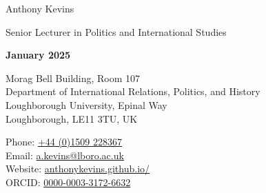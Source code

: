 \documentclass[letterpaper,fontsize=10.5pt]{scrartcl}
\begin{document}


\huge Anthony Kevins\\
\begin{minipage}[t]{.75\linewidth}
	\large Senior Lecturer in Politics and International Studies\\ 
\end{minipage}%
\begin{minipage}[t]{.25\linewidth}
	\raggedleft
	\scriptsize \textbf{January 2025}\\
\end{minipage}%
\normalsize

\hrulefill

\begin{minipage}[p]{.6\linewidth}
	\raggedright
	\medskip
	Morag Bell Building, Room 107\\
	Department of International Relations, Politics, and History\\
	Loughborough University, Epinal Way\\
	Loughborough, LE11 3TU, UK\\
	\medskip
\end{minipage}%
\begin{minipage}[p]{.4\linewidth}
	\raggedleft
	\medskip
	Phone: \href{tel:+4401509228367}{+44 (0)1509 228367}\\
	Email: \href{mailto:a.kevins@lboro.ac.uk}{a.kevins@lboro.ac.uk}\\
	Website: \href{https://anthonykevins.github.io/}{anthonykevins.github.io/}\\
	ORCID: \href{https://orcid.org/0000-0003-3172-6632}{0000-0003-3172-6632}\\
	\medskip%
\end{minipage}

\hrulefill

\end{document}
